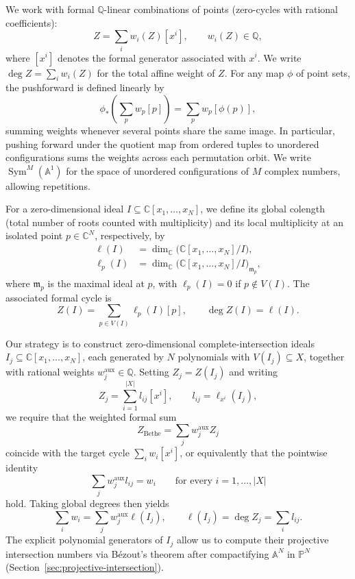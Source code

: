 \documentclass[11pt]{article}
\theoremstyle{definition}
\newcommand{\A}{\mathbb{A}}
\newcommand{\C}{\mathbb{C}}
\newcommand{\Sym}{\operatorname{Sym}}
\begin{document}
We work with formal $\mathbb{Q}$-linear combinations of points (zero-cycles with rational coefficients):
\[
Z=\sum_i w_i(Z)[x^i],\qquad w_i(Z)\in\mathbb{Q},
\]
where $[x^i]$ denotes the formal generator associated with $x^i$. We write
$\deg Z=\sum_i w_i(Z)$ for the total affine weight of $Z$.
For any map $\phi$ of point sets, the pushforward is defined linearly by
\[
\phi_*\!\left(\sum_p w_p[p]\right)=\sum_p w_p[\phi(p)],
\]
summing weights whenever several points share the same image. In
particular, pushing forward under the quotient map from ordered tuples to unordered configurations
sums the weights across each permutation orbit. We write
$\Sym^M(\A^1)$ for the space of unordered configurations of $M$ complex
numbers, allowing repetitions.

For a zero-dimensional ideal $I\subseteq\C[x_1,\ldots,x_N]$, we define
its global colength (total number of roots counted with multiplicity) and its local
multiplicity at an isolated point $p\in\C^N$, respectively, by
\[
\begin{aligned}
	\ell(I)&=\dim_\C\bigl(\C[x_1,\ldots,x_N]/I\bigr),\\
	\ell_p(I)&=\dim_\C\bigl(\C[x_1,\ldots,x_N]/I\bigr)_{\mathfrak{m}_p},
\end{aligned}
\]
where $\mathfrak{m}_p$ is the maximal ideal at $p$, with
$\ell_p(I)=0$ if $p\notin V(I)$. The associated formal cycle is
\[
Z(I)=\sum_{p\in V(I)}\ell_p(I)[p],
\qquad
\deg Z(I)=\ell(I).
\]

Our strategy is to construct zero-dimensional complete-intersection ideals
$I_j\subseteq\C[x_1,\ldots,x_N]$, each generated by $N$ polynomials with
$V(I_j)\subseteq X$, together with rational weights $w_j^{\mathrm{aux}}\in\mathbb{Q}$. Setting $Z_j=Z(I_j)$ and writing
\[
Z_j=\sum_{i=1}^{|X|} l_{ij}[x^i],\qquad
l_{ij}=\ell_{x^i}(I_j),
\]
we require that the weighted formal sum
\begin{equation}\label{eq:weight-cycle}
	Z_{\mathrm{Bethe}}=\sum_j w_j^{\mathrm{aux}}Z_j
\end{equation}
coincide with the target cycle $\sum_i w_i[x^i]$, or equivalently that the pointwise identity
\begin{equation}\label{eq:local-weight-decomposition}
	\sum_j w_j^{\mathrm{aux}}l_{ij}=w_i\qquad\text{for every }i=1,\ldots,|X|
\end{equation}
hold. Taking global degrees then yields
\begin{equation}\label{eq:global-weight-decomposition}
	\sum_i w_i=\sum_j w_j^{\mathrm{aux}}\ell(I_j),\qquad
	\ell(I_j)=\deg Z_j=\sum_i l_{ij}.
\end{equation}
The explicit polynomial generators of $I_j$ allow us to compute their projective
intersection numbers via B\'ezout's theorem after compactifying $\A^N$ in $\mathbb{P}^N$ (Section~\ref{sec:projective-intersection}).
\end{document}
